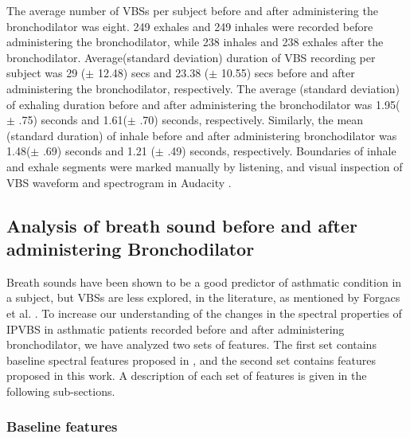 \documentclass{article}
\begin{document}
The average number of VBSs per subject before and after administering the bronchodilator was eight. 249 exhales and 249 inhales were recorded before administering the bronchodilator, while 238 inhales and 238 exhales after the bronchodilator. Average(standard deviation) duration of VBS recording per subject was 29 ($\pm$ 12.48) secs and 23.38 ($\pm$ 10.55) secs before and after administering the  bronchodilator, respectively. The average (standard deviation) of exhaling duration before and after administering the  bronchodilator was 1.95($\pm$ .75) seconds and 1.61($\pm$ .70) seconds, respectively. Similarly, the mean (standard duration) of inhale before and after administering bronchodilator was 1.48($\pm$ .69) seconds and 1.21 ($\pm$ .49) seconds, respectively. Boundaries of inhale and exhale segments were marked manually by listening, and visual inspection of VBS waveform and spectrogram in Audacity \cite{mazzoni2000audacity}.
%

\subsection{Analysis of breath sound before and after administering Bronchodilator}

Breath sounds have been shown to be a good predictor of asthmatic condition in a subject, but VBSs are less explored, in the literature, as mentioned by Forgacs et al. \cite{forgacs1971breath}. To increase our understanding of the changes in the spectral properties of IPVBS in asthmatic patients recorded before and after administering bronchodilator, we have analyzed two sets of features. The first set contains baseline spectral features proposed in \cite{tabata2018changes}, and the second set contains features proposed in this work. A description of each set of features is given in the following sub-sections.




\subsubsection{Baseline features}
\end{document}
